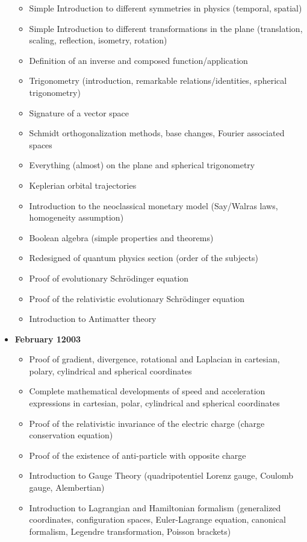 \begin{itemize}
\begin{itemize}[noitemsep]
			\item Simple Introduction to different symmetries in physics (temporal, spatial)
			\item Simple Introduction to different transformations in the plane (translation, scaling, reflection, isometry, rotation)
			\item Definition of an inverse and composed function/application
			\item Trigonometry (introduction, remarkable relations/identities, spherical trigonometry)
			\item Signature of a vector space
			\item Schmidt orthogonalization methods, base changes, Fourier associated spaces
			\item Everything (almost) on the plane and spherical trigonometry
			\item Keplerian orbital trajectories
			\item Introduction to the neoclassical monetary model (Say/Walras laws, homogeneity assumption)
			\item Boolean algebra (simple properties and theorems)
			\item Redesigned of quantum physics section (order of the subjects)
			\item Proof of evolutionary Schrödinger  equation
			\item Proof of the relativistic evolutionary Schrödinger equation
			\item Introduction to Antimatter theory
		\end{itemize}
	\item \textbf{February 12003}
			\begin{itemize}[noitemsep]
			\item Proof of gradient, divergence, rotational and Laplacian in cartesian, polary, cylindrical and spherical coordinates
			\item Complete mathematical developments of speed and acceleration expressions in cartesian, polar, cylindrical and spherical coordinates 
			\item Proof  of the relativistic invariance of the electric charge (charge conservation equation) 
			\item Proof of the existence of anti-particle  with opposite charge 
			\item Introduction to Gauge Theory (quadripotentiel Lorenz gauge, Coulomb gauge, Alembertian) 
			\item Introduction to Lagrangian and Hamiltonian formalism (generalized coordinates, configuration spaces, Euler-Lagrange equation, canonical formalism, Legendre transformation, Poisson brackets) 

\end{itemize}
\end{itemize}

